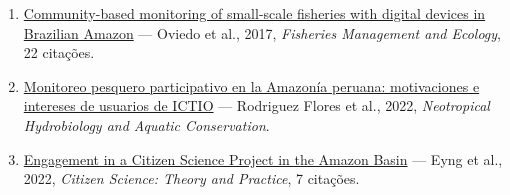 \documentclass[11pt,a4paper]{article}
\begin{document}
{\begin{enumerate}
\item \href{https://consensus.app/papers/details/87069eba9f5157519d8e21171f0a9468/}{Community-based monitoring of small-scale fisheries with digital devices in Brazilian Amazon} --- Oviedo et al., 2017, \textit{Fisheries Management and Ecology}, 22 citações.
\item \href{https://consensus.app/papers/details/fca3b921d3d0590a84ce80c78678333c/}{Monitoreo pesquero participativo en la Amazonía peruana: motivaciones e intereses de usuarios de ICTIO} --- Rodriguez Flores et al., 2022, \textit{Neotropical Hydrobiology and Aquatic Conservation}.
\item \href{https://consensus.app/papers/details/583a95605c14578598bc101119a60fb0/}{Engagement in a Citizen Science Project in the Amazon Basin} --- Eyng et al., 2022, \textit{Citizen Science: Theory and Practice}, 7 citações.
\end{enumerate}
}
\end{document}
